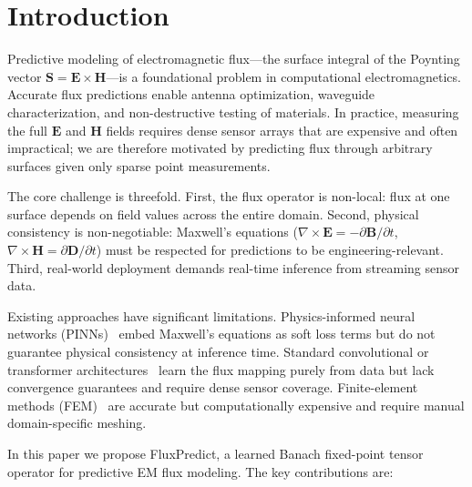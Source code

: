 \documentclass[12pt]{article}
\begin{document}
\section{Introduction}

Predictive modeling of electromagnetic flux---the surface integral of the Poynting vector $\mathbf{S} = \mathbf{E} \times \mathbf{H}$---is a foundational problem in computational electromagnetics. Accurate flux predictions enable antenna optimization, waveguide characterization, and non-destructive testing of materials. In practice, measuring the full $\mathbf{E}$ and $\mathbf{H}$ fields requires dense sensor arrays that are expensive and often impractical; we are therefore motivated by predicting flux through arbitrary surfaces given only sparse point measurements.

The core challenge is threefold. First, the flux operator is non-local: flux at one surface depends on field values across the entire domain. Second, physical consistency is non-negotiable: Maxwell's equations ($\nabla \times \mathbf{E} = -\partial\mathbf{B}/\partial t$, $\nabla \times \mathbf{H} = \partial\mathbf{D}/\partial t$) must be respected for predictions to be engineering-relevant. Third, real-world deployment demands real-time inference from streaming sensor data.

Existing approaches have significant limitations. Physics-informed neural networks (PINNs)~\cite{raissi2019physics} embed Maxwell's equations as soft loss terms but do not guarantee physical consistency at inference time. Standard convolutional or transformer architectures~\cite{vaswani2017attention} learn the flux mapping purely from data but lack convergence guarantees and require dense sensor coverage. Finite-element methods (FEM)~\cite{jin2014finite} are accurate but computationally expensive and require manual domain-specific meshing.

In this paper we propose FluxPredict, a learned Banach fixed-point tensor operator for predictive EM flux modeling. The key contributions are:
\end{document}

